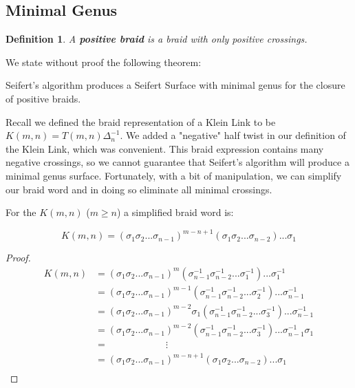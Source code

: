 \documentclass[12pt]{article}
\newtheorem{definition}{Definition}[section]
\newenvironment{theorem}[2][Theorem]{\begin{trivlist}
\item[\hskip \labelsep {\bfseries #1}\hskip \labelsep {\bfseries #2.}]}{\end{trivlist}}
\begin{document}
\subsection{Minimal Genus}

\begin{definition}
A \textbf{positive braid} is a braid with only positive crossings.
\end{definition}

We state without proof the following theorem:

\begin{theorem}{2.3}
Seifert's algorithm produces a Seifert Surface with minimal genus for the closure of positive braids.
\end{theorem}

Recall we defined the braid representation of a Klein Link to be $K(m, n) = T(m, n) \Delta^{-1}_n$. We added a "negative" half twist in our definition of the Klein Link, which was convenient. This braid expression contains many negative crossings, so we cannot guarantee that Seifert's algorithm will produce a minimal genus surface. Fortunately, with a bit of manipulation, we can simplify our braid word and in doing so eliminate all minimal crossings.

\begin{theorem}{2.4}
For the $K(m, n)$ ($m \geq n$) a simplified braid word is:

\end{theorem}
\begin{equation}
K(m, n) = (\sigma_1 \sigma_2 ... \sigma_{n-1})^{m-n+1}(\sigma_1 \sigma_2...\sigma_{n-2})...\sigma_1
\end{equation}

\begin{proof}
\begin{align*}
K(m, n) &= (\sigma_1 \sigma_2 ... \sigma_{n-1})^m (\sigma_{n-1}^{-1} \sigma_{n-2}^{-1}... \sigma_1^{-1})...\sigma_1^{-1}\\
&=(\sigma_1 \sigma_2...\sigma_{n-1})^{m-1}(\sigma_{n-1}^{-1} \sigma_{n-2}^{-1}...\sigma_2^{-1})...\sigma_{n-1}^{-1} \\
&=(\sigma_1 \sigma_2...\sigma_{n-1})^{m-2}\sigma_1 (\sigma_{n-1}^{-1} \sigma_{n-2}^{-1}...\sigma_3^{-1})...\sigma_{n-1}^{-1}  \\
&= (\sigma_1 \sigma_2...\sigma_{n-1})^{m-2} (\sigma_{n-1}^{-1} \sigma_{n-2}^{-1}...\sigma_3^{-1})...\sigma_{n-1}^{-1} \sigma_1 \\
&=  \hspace{1in} \vdots \\
&= (\sigma_1 \sigma_2...\sigma_{n-1})^{m-n+1}(\sigma_1 \sigma_2 ... \sigma_{n-2})...\sigma_1 \\
\end{align*}
\end{proof}
\end{document}
